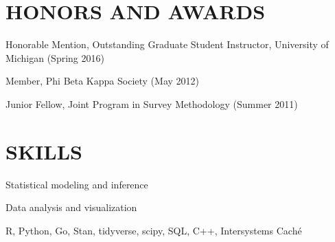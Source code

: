 \documentclass[letterpaper, 11pt]{article}
\begin{document}
\vspace{18pt}
\section{HONORS AND AWARDS}          
Honorable Mention, Outstanding Graduate Student Instructor, University of Michigan (Spring 2016)

Member, Phi Beta Kappa Society (May 2012)

Junior Fellow, Joint Program in Survey Methodology (Summer 2011)
   
\section{SKILLS}
Statistical modeling and inference

Data analysis and visualization

R, Python, Go, Stan, tidyverse, scipy, SQL, C++, Intersystems Cach\'{e}

\label{sec:lastpage}
\end{document}
